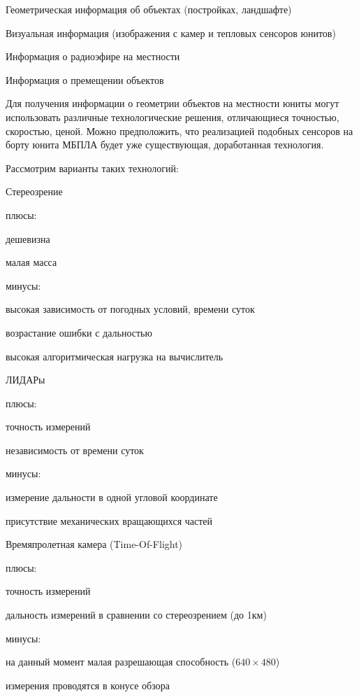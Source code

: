 \begin{mintemize}
\item Геометрическая информация об объектах (постройках, ландшафте)
\item Визуальная информация (изображения с камер и тепловых сенсоров юнитов)
\item Информация о радиоэфире на местности
\item Информация о премещении объектов
\end{mintemize}

Для получения информации о геометрии объектов на местности юниты могут
использовать различные технологические решения, отличающиеся точностью,
скоростью, ценой. Можно предположить, что реализацией подобных сенсоров на
борту юнита МБПЛА будет уже существующая, доработанная технология.

Рассмотрим варианты таких технологий:

\begin{mintemize}
\item Стереозрение

    плюсы:
    \begin{mintemize}
    \item дешевизна
    \item малая масса
    \end{mintemize}
    минусы:
    \begin{mintemize}
    \item высокая зависимость от погодных условий, времени суток
    \item возрастание ошибки с дальностью
    \item высокая алгоритмическая нагрузка на вычислитель
    \end{mintemize}
\item ЛИДАРы

    плюсы:
    \begin{mintemize}
    \item точность измерений
    \item независимость от времени суток
    \end{mintemize}
    минусы:
    \begin{mintemize}
    \item измерение дальности в одной угловой координате
    \item присутствие механических вращающихся частей
    \end{mintemize}

\item Времяпролетная камера (Time-Of-Flight)

    плюсы:
    \begin{mintemize}
    \item точность измерений
    \item дальность измерений в сравнении со стереозрением (до 1км)
    \end{mintemize}
    минусы:
    \begin{mintemize}
    \item на данный момент малая разрешающая способность ($640 \times 480$)
    \item измерения проводятся в конусе обзора
    \end{mintemize}
\end{mintemize}

